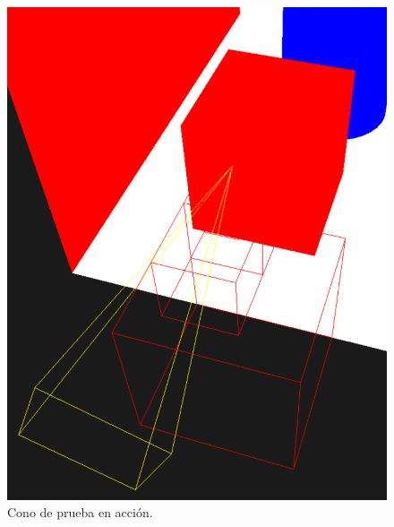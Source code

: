 \begin{figure}[h]
    \centering
    \includegraphics[width=.5\textwidth]{picker-action.png}
    \caption{Cono de prueba en acción.}
    \label{fig:picker-action}
\end{figure}

